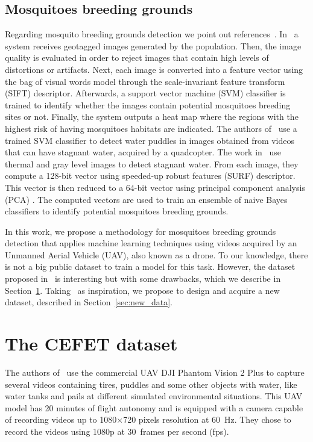 \subsection{Mosquitoes breeding grounds}
%
Regarding mosquito breeding grounds detection we point out references~\cite{Agarwal2014a, Prasad2015a, Mehra2016a}.
%
In~\cite{Agarwal2014a} a system receives geotagged images generated by the population.
Then, the image quality is evaluated in order to reject images that contain high levels of distortions or artifacts.
Next, each image is converted into a feature vector using the bag of visual words model through
the scale-invariant feature transform (SIFT) descriptor.
Afterwards, a support vector machine (SVM) classifier is trained to identify whether the
images contain potential mosquitoes breeding sites or not.
Finally, the system outputs a heat map where the regions with the highest risk of having mosquitoes habitats are indicated.
%
The authors of~\cite{Prasad2015a} use a trained SVM classifier to detect water puddles in images obtained from videos that can have stagnant water, acquired by a quadcopter.
%
The work in~\cite{Mehra2016a} use thermal and gray level images to detect stagnant water.
From each image, they compute a 128-bit vector using speeded-up robust features (SURF)
descriptor.
This vector is then reduced to a 64-bit vector using principal component analysis (PCA)
.
The computed vectors are used to train an ensemble of naive Bayes classifiers to identify potential mosquitoes breeding grounds.

In this work, we propose a methodology for mosquitoes breeding grounds detection that applies machine learning techniques using videos acquired by an Unmanned Aerial Vehicle (UAV), also known as a drone.
%
To our knowledge, there is not a big public dataset to train a model for this task.
However, the dataset proposed in~\cite{casfinal2018} is interesting but with some drawbacks, which we describe in Section~\ref{sec:cefet_data}.
Taking~\cite{casfinal2018} as inspiration, we propose to design and acquire a new dataset, described in Section~\ref{sec:new_data}.


\section{The CEFET dataset}\label{sec:cefet_data}
%
The authors of~\cite{casfinal2018} use the commercial UAV DJI Phantom Vision 2 Plus to capture several videos containing tires, puddles and some other objects with water, like water tanks and pails at different simulated environmental situations.
This UAV model has 20 minutes of flight autonomy and is equipped with a camera capable of recording videos up to 1080$\times$720 pixels resolution at 60~Hz.
They chose to record the videos using 1080p at 30~frames per second (fps).

